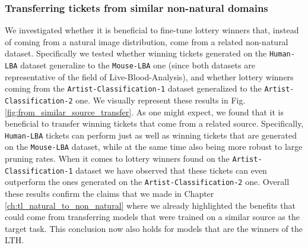 

\subsubsection{Transferring tickets from similar non-natural domains}
We investigated whether it is beneficial to fine-tune lottery winners that, instead of coming from a natural image distribution, come from a related non-natural dataset. Specifically we tested whether winning tickets generated on the \texttt{Human-LBA} dataset generalize to the \texttt{Mouse-LBA} one (since both datasets are representative of the field of Live-Blood-Analysis), and whether lottery winners coming from the \texttt{Artist-Classification-1} dataset generalized to the \texttt{Artist-Classification-2} one. We visually represent these results in Fig. \ref{fig:from_similar_source_transfer}. As one might expect, we found that it is beneficial to transfer winning tickets that come from a related source. Specifically, \texttt{Human-LBA} tickets can perform just as well as winning tickets that are generated on the \texttt{Mouse-LBA} dataset, while at the same time also being more robust to large pruning rates. When it comes to lottery winners found on the \texttt{Artist-Classification-1} dataset we have observed that these tickets can even outperform the ones generated on the \texttt{Artist-Classification-2} one. Overall these results confirm the claims that we made in Chapter \ref{ch:tl_natural_to_non_natural} where we already highlighted the benefits that could come from transferring models that were trained on a similar source as the target task. This conclusion now also holds for models that are the winners of the LTH. 




